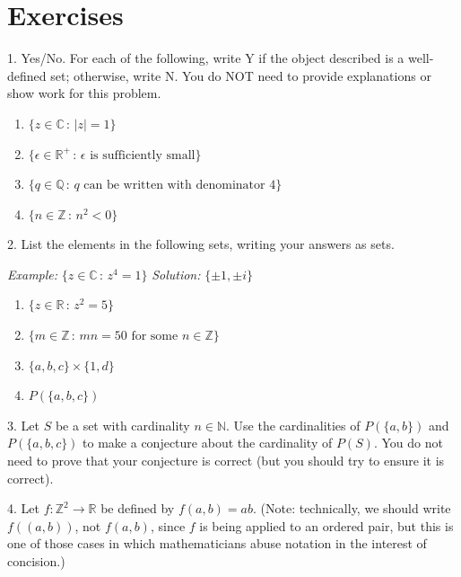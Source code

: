 \documentclass[10pt,]{book}
\theoremstyle{plain}
\theoremstyle{definition}
\theoremstyle{definition}
\theoremstyle{definition}
\theoremstyle{definition}
\numberwithin{equation}{section}
\def\Z{\mathbb{Z}}
\def\R{\mathbb{R}}
\def\Q{\mathbb{Q}}
\def\C{\mathbb{C}}
\def\N{\mathbb{N}}
\newcommand{\lt}{<}
\begin{document}
\section[{Exercises}]{Exercises}\label{exercises-1}
\begin{exerciselist}
\item[1.]\hypertarget{exercise-1}{}Yes/No. For each of the following, write Y if the object described is a well-defined set; otherwise, write N. You do NOT need to provide explanations or show work for this problem. \leavevmode%
\begin{enumerate}[label=(\alph*)]
\item\hypertarget{li-23}{}\(\{z \in \C \,:\, |z|=1\}\)%
\item\hypertarget{li-24}{}\(\{\epsilon \in \R^+\,:\, \epsilon \mbox{ is sufficiently small} \}\)%
\item\hypertarget{li-25}{}\(\{q\in \Q \,:\, q \mbox{ can be written  with denominator } 4\}\)%
\item\hypertarget{li-26}{}\(\{n \in \Z\,:\, n^2 \lt 0\}\)%
\end{enumerate}
%
\par\smallskip
\item[2.]\hypertarget{exercise-2}{}List the elements in the following sets, writing your answers as sets.%
\par
\emph{Example:} \(\{z\in \C\,:\,z^4=1\}\) \emph{Solution:} \(\{\pm 1, \pm i\}\) \leavevmode%
\begin{enumerate}[label=(\alph*)]
\item\hypertarget{li-31}{}\(\{z\in \R\,:\, z^2=5\}\)%
\item\hypertarget{li-32}{}\(\{m \in \Z\,:\, mn=50 \mbox{ for some } n\in \Z\}\)%
\item\hypertarget{li-33}{}\(\{a,b,c\}\times \{1,d\}\)%
\item\hypertarget{li-34}{}\(P(\{a,b,c\})\)%
\end{enumerate}
%
\par\smallskip
\item[3.]\hypertarget{exercise-3}{}Let \(S\) be a set with cardinality \(n\in \N\). Use the cardinalities of \(P(\{a,b\})\) and \(P(\{a,b,c\})\) to make a conjecture about the cardinality of \(P(S)\). You do not need to prove that your conjecture is correct (but you should try to ensure it is correct).%
\par\smallskip
\item[4.]\hypertarget{exercise-4}{}Let \(f: \Z^2 \to \R\) be defined by \(f(a,b)=ab\). (Note: technically, we should write \(f((a,b))\), not \(f(a,b)\), since \(f\) is being applied to an ordered pair, but this is one of those cases in which mathematicians abuse notation in the interest of concision.)%

\end{exerciselist}
\end{document}
